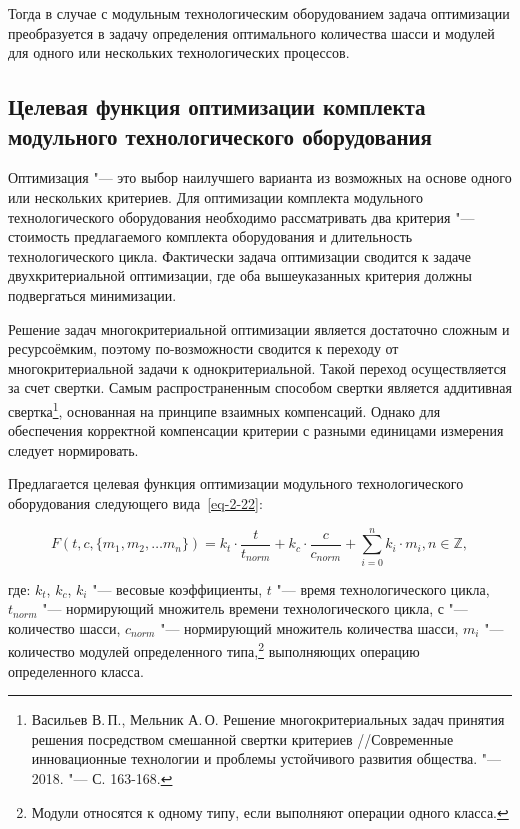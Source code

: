 Тогда в случае с модульным технологическим оборудованием задача оптимизации преобразуется в задачу определения оптимального количества шасси и модулей для одного или нескольких технологических процессов.

\subsection{Целевая функция оптимизации комплекта модульного технологического оборудования}\label{sec:target-func}

Оптимизация "--- это выбор наилучшего варианта из возможных на основе одного или нескольких критериев. Для оптимизации комплекта модульного технологического оборудования необходимо рассматривать два критерия "--- стоимость предлагаемого комплекта оборудования и длительность технологического цикла. Фактически задача оптимизации сводится к задаче двухкритериальной оптимизации, где оба вышеуказанных критерия должны подвергаться минимизации.

Решение задач многокритериальной оптимизации является достаточно сложным и ресурсоёмким, поэтому по-возможности сводится к переходу от многокритериальной задачи к однокритериальной. Такой переход осуществляется за счет свертки. Самым распространенным способом свертки является аддитивная свертка\footnote{Васильев В.\,П., Мельник А.\,О. Решение многокритериальных задач принятия решения посредством смешанной свертки критериев //Современные инновационные технологии и проблемы устойчивого развития общества. "--- 2018. "--- С. 163-168.}, основанная на принципе взаимных компенсаций. Однако для обеспечения корректной компенсации критерии с разными единицами измерения следует нормировать.
 
Предлагается целевая функция оптимизации модульного технологического оборудования следующего вида~\cref{eq-2-22}:

\begin{equation}
F(t, c, \{m_1, m_2, \ldots m_n \}) = k_t \cdot \frac{t}{t_{norm}} + k_c \cdot \frac{c}{c_{norm}} + \sum_{i=0}^{n}k_i \cdot m_i, n \in \mathbb{Z},
\label{eq-2-22}
\end{equation}

\noindent где:
\noindent $k_t$, $k_c$, $k_i$ "--- весовые коэффициенты,
\noindent $t$ "--- время технологического цикла,
\noindent $t_{norm}$ "--- нормирующий множитель времени технологического цикла,
\noindent $с$ "--- количество шасси,
\noindent $c_{norm}$ "--- нормирующий множитель количества шасси,
\noindent $m_i$ "--- количество модулей определенного типа,\footnote{Модули относятся к одному типу, если выполняют операции одного класса.} выполняющих операцию определенного класса.

